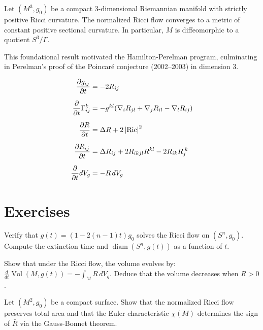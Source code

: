 \begin{theorem}[Hamilton, 1982]
\label{thm:hamilton_3d}
Let $(M^3, g_0)$ be a compact $3$-dimensional Riemannian manifold with strictly
positive Ricci curvature. The normalized Ricci flow converges to a metric of
constant positive sectional curvature. In particular, $M$ is diffeomorphic to a
quotient $S^3/\Gamma$.
\end{theorem}

\begin{remark}
This foundational result motivated the Hamilton-Perelman program, culminating in
Perelman's proof of the Poincar\'e conjecture (2002--2003) in dimension $3$.
\end{remark}

\begin{keyformulas}[title=\textbf{Evolution equations under the Ricci flow}]
\begin{align*}
    \frac{\partial g_{ij}}{\partial t} &= -2R_{ij} \\[6pt]
    \frac{\partial}{\partial t}\Gamma_{ij}^k &= -g^{kl}(\nabla_i R_{jl}
        + \nabla_j R_{il} - \nabla_l R_{ij}) \\[6pt]
    \frac{\partial R}{\partial t} &= \Delta R + 2\left| \operatorname{Ric} \right|^2 \\[6pt]
    \frac{\partial R_{ij}}{\partial t} &= \Delta R_{ij} + 2R_{ikjl}R^{kl}
        - 2R_{ik}R_j^{\;k} \\[6pt]
    \frac{\partial}{\partial t}dV_g &= -R\, dV_g
\end{align*}
\end{keyformulas}

\section{Exercises}

\begin{exercise}
Verify that $g(t) = (1 - 2(n-1)t) g_0$ solves the Ricci flow on $(S^n, g_0)$.
Compute the extinction time and $\operatorname{diam}(S^n, g(t))$ as a function of $t$.
\end{exercise}

\begin{exercise}
Show that under the Ricci flow, the volume evolves by:
$\frac{d}{dt}\operatorname{Vol}(M, g(t)) = -\int_M R\, dV_g$.
Deduce that the volume decreases when $R > 0$.
\end{exercise}

\begin{exercise}
Let $(M^2, g_0)$ be a compact surface. Show that the normalized Ricci flow preserves
total area and that the Euler characteristic $\chi(M)$ determines the sign of
$\bar{R}$ via the Gauss-Bonnet theorem.
\end{exercise}

